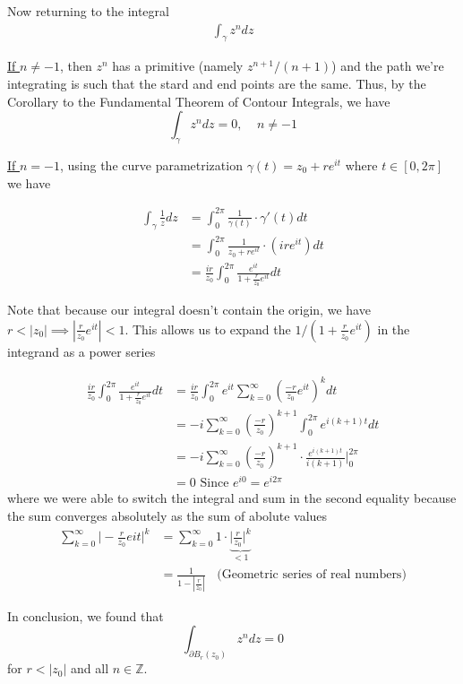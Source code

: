 \documentclass{article}
\begin{document}
\begin{enumerate}[label=(\alph*)]
  \vskip 0.5cm
  Now returning to the integral
  \begin{align*}
    \int_{\gamma} z^n dz  
  \end{align*}

  \underline{If $n \neq -1$}, then $z^n$ has a primitive (namely $z^{n+1}/(n+1)$) and the path we're integrating is such that the stard and end points are the same. Thus, by the Corollary to the Fundamental Theorem of Contour Integrals, we have 
  \[ \int_{\gamma} z^n dz = 0, \;\;\;\;n \neq -1  \]
  
  \vskip 0.5cm
  \underline{If $n = -1$}, using the curve parametrization $\gamma(t) = z_0 + re^{it}$ where $t \in [0, 2\pi]$ we have 
  
  \begin{align*}
    \int_{\gamma} \frac{1}{z} dz &= \int_{0}^{2\pi} \frac{1}{\gamma(t)} \cdot \gamma'(t) dt \\
    &= \int_{0}^{2\pi} \frac{1}{z_0 + re^{it}} \cdot (ire^{it}) dt \\
    &= \frac{i r}{z_0} \int_{0}^{2\pi} \frac{e^{it}}{1 + \frac{r}{z_0} e^{it}} dt
  \end{align*}

  Note that because our integral doesn't contain the origin, we have $r < |z_0| \implies |\frac{r}{z_0}e^{it}| < 1$. This allows us to expand the $1/(1 + \frac{r}{z_0}e^{it})$ in the integrand as a power series

  \begin{align*}
    \frac{ir}{z_0} \int _{0}^{2\pi} \frac{e^{it}}{1 + \frac{r}{z_0}e^{it}} dt &= \frac{ir}{z_0}\int _{0}^{2\pi} e^{it} \sum_{k = 0}^{\infty} \left( \frac{-r}{z_0} e^{it} \right)^k dt \\
    &= -i \sum_{k = 0}^{\infty} \left( \frac{-r}{z_0} \right)^{k+1} \int_{0}^{2\pi} e^{i(k+1)t} dt \\
    &= -i \sum_{k = 0}^{\infty} \left( \frac{-r}{z_0} \right)^{k+1} \cdot \frac{e^{i(k+1)t}}{i(k+1)} \Big\vert_{0}^{2\pi} \\
    &= 0 \text{  Since $e^{i0} = e^{i2\pi}$}
  \end{align*}
  where we were able to switch the integral and sum in the second equality because the sum converges absolutely as the sum of abolute values
  \begin{align*}
    \sum_{k = 0}^{\infty} \big\lvert -\frac{r}{z_0} e{it} \big\rvert^k &= \sum_{k = 0}^{\infty} 1 \cdot \underbrace{\big\lvert \frac{r}{z_0} \big\rvert^k}_{<1} \\
    &= \frac{1}{1 - |\frac{r}{z_0}|} \;\;\text{ (Geometric series of real numbers)}
  \end{align*}

  \begin{dottedbox}
    In conclusion, we found that 
    \[ \int_{\partial B_r(z_0)} z^n dz = 0 \]
    for $r < |z_0|$ and all $n \in \mathbb{Z}$.
  \end{dottedbox}
\end{enumerate}
\end{document}
